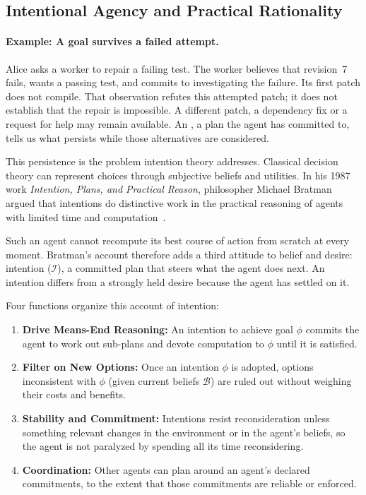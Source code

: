 \subsection{Intentional Agency and Practical Rationality}

\paragraph{Example: A goal survives a failed attempt.}
Alice asks a worker to repair a failing test. The worker believes that revision~7
fails, wants a passing test, and commits to investigating the failure. Its first
patch does not compile. That observation refutes this attempted patch; it does
not establish that the repair is impossible. A different patch, a dependency
fix or a request for help may remain available. An , a plan
the agent has committed to, tells us what persists while those alternatives
are considered.

This persistence is the problem intention theory addresses. Classical decision theory can represent choices through subjective beliefs and utilities. In his 1987 work \emph{Intention, Plans, and Practical Reason}, philosopher Michael Bratman argued that intentions do distinctive work in the practical reasoning of agents with limited time and computation~.

Such an agent cannot recompute its best course of action from scratch at every moment. Bratman's account therefore adds a third attitude to belief and desire: intention ($\mathcal{I}$), a committed plan that steers what the agent does next. An intention differs from a strongly held desire because the agent has settled on it.

%
Four functions organize this account of intention:
\begin{enumerate}[leftmargin=1.8em,itemsep=2pt]
  \item \textbf{Drive Means-End Reasoning:} An intention to achieve goal $\phi$ commits the agent to work out sub-plans and devote computation to $\phi$ until it is satisfied.
  \item \textbf{Filter on New Options:} Once an intention $\phi$ is adopted, options inconsistent with $\phi$ (given current beliefs $\mathcal{B}$) are ruled out without weighing their costs and benefits.
  \item \textbf{Stability and Commitment:} Intentions resist reconsideration unless something relevant changes in the environment or in the agent's beliefs, so the agent is not paralyzed by spending all its time reconsidering.
  \item \textbf{Coordination:} Other agents can plan around an agent's declared commitments, to the extent that those commitments are reliable or enforced.
\end{enumerate}

